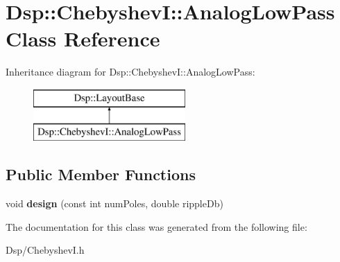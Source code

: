 \hypertarget{classDsp_1_1ChebyshevI_1_1AnalogLowPass}{\section{Dsp\-:\-:Chebyshev\-I\-:\-:Analog\-Low\-Pass Class Reference}
\label{classDsp_1_1ChebyshevI_1_1AnalogLowPass}
}
Inheritance diagram for Dsp\-:\-:Chebyshev\-I\-:\-:Analog\-Low\-Pass\-:\begin{figure}[H]
\begin{center}
\leavevmode
\includegraphics[height=2.000000cm]{classDsp_1_1ChebyshevI_1_1AnalogLowPass}
\end{center}
\end{figure}
\subsection*{Public Member Functions}
\begin{DoxyCompactItemize}
\item 
\hypertarget{classDsp_1_1ChebyshevI_1_1AnalogLowPass_aa6713805cd44b18fbb9486038511b6d1}{void {\bfseries design} (const int num\-Poles, double ripple\-Db)}\label{classDsp_1_1ChebyshevI_1_1AnalogLowPass_aa6713805cd44b18fbb9486038511b6d1}

\end{DoxyCompactItemize}


The documentation for this class was generated from the following file\-:\begin{DoxyCompactItemize}
\item 
Dsp/Chebyshev\-I.\-h\end{DoxyCompactItemize}
